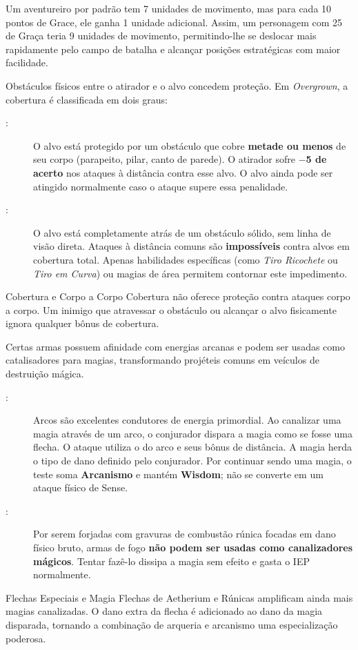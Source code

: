 Um aventureiro por padrão tem 7 unidades de movimento, mas para cada 10 pontos de Grace, ele ganha 1 unidade adicional. Assim, um personagem com 25 de Graça teria 9 unidades de movimento, permitindo-lhe se deslocar mais rapidamente pelo campo de batalha e alcançar posições estratégicas com maior facilidade.


Obstáculos físicos entre o atirador e o alvo concedem proteção. Em \textit{Overgrown}, a cobertura é classificada em dois graus:

\begin{description}
    \item[:] O alvo está protegido por um obstáculo que cobre \textbf{metade ou menos} de seu corpo (parapeito, pilar, canto de parede). O atirador sofre \textbf{$-$5 de acerto} nos ataques à distância contra esse alvo. O alvo ainda pode ser atingido normalmente caso o ataque supere essa penalidade.
    \item[:] O alvo está completamente atrás de um obstáculo sólido, sem linha de visão direta. Ataques à distância comuns são \textbf{impossíveis} contra alvos em cobertura total. Apenas habilidades específicas (como \textit{Tiro Ricochete} ou \textit{Tiro em Curva}) ou magias de área permitem contornar este impedimento.
\end{description}

\begin{rpgboxtips}{Cobertura e Corpo a Corpo}
Cobertura não oferece proteção contra ataques corpo a corpo. Um inimigo que atravessar o obstáculo ou alcançar o alvo fisicamente ignora qualquer bônus de cobertura.
\end{rpgboxtips}


Certas armas possuem afinidade com energias arcanas e podem ser usadas como catalisadores para magias, transformando projéteis comuns em veículos de destruição mágica.

\begin{description}
    \item[:] Arcos são excelentes condutores de energia primordial. Ao canalizar uma magia através de um arco, o conjurador dispara a magia como se fosse uma flecha. O ataque utiliza o  do arco e seus bônus de distância. A magia herda o tipo de dano definido pelo conjurador. Por continuar sendo uma magia, o teste soma \textbf{Arcanismo} e mantém \textbf{Wisdom}; não se converte em um ataque físico de Sense.
    \item[:] Por serem forjadas com gravuras de combustão rúnica focadas em dano físico bruto, armas de fogo \textbf{não podem ser usadas como canalizadores mágicos}. Tentar fazê-lo dissipa a magia sem efeito e gasta o IEP normalmente.
\end{description}

\begin{rpgboxtips}{Flechas Especiais e Magia}
Flechas de Aetherium e Rúnicas amplificam ainda mais magias canalizadas. O dano extra da flecha é adicionado ao dano da magia disparada, tornando a combinação de arqueria e arcanismo uma especialização poderosa.
\end{rpgboxtips}
